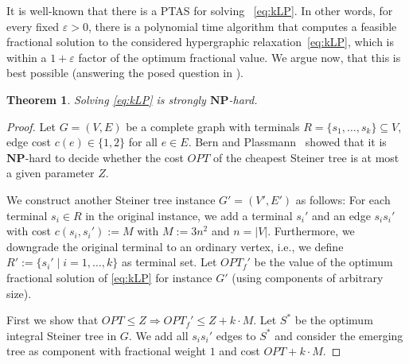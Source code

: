 \documentclass[11pt, letterpaper]{article}
\newtheorem{theorem}{Theorem}[section]
\theoremstyle{definition}
\newcommand{\neil}[1]{}
\newcommand{\neil}[1]{\emph{\color{darkgreen}{Neil: #1}}}
\begin{document}
It is well-known that there is a PTAS for solving ~\eqref{eq:kLP}. In other words, for every 
fixed $\varepsilon > 0$, there is a polynomial time algorithm that computes a feasible fractional solution 
to the considered hypergraphic relaxation~\eqref{eq:kLP}, which is within a $1+\varepsilon$ factor
of the optimum fractional value. 
We argue now, that this is best possible (answering the posed question in \cite{chakrabarty_2010_hypergraphic}).
\begin{theorem}
Solving \eqref{eq:kLP} is strongly $\mathbf{NP}$-hard. 
\end{theorem}
\begin{proof}
Let $G=(V,E)$ be a complete graph with terminals $R = \{ s_1,\ldots,s_k\}  \subseteq V$, edge cost 
$c(e) \in \{ 1,2\}$ for all $e \in E$. Bern and Plassmann~\cite{BP89} showed that  
it is $\mathbf{NP}$-hard to decide whether the cost $OPT$ of the 
cheapest Steiner tree is at most a given parameter $Z$. 

We construct another Steiner tree instance $G'=(V',E')$ as follows: 
For each terminal $s_i \in R$ in the original instance, we add 
a terminal $s_i'$ and an edge $s_is_i'$ with cost $c(s_i,s_i') := M$ with $M := 3n^2$ and $n= |V|$.
Furthermore, we downgrade the original terminal to
an ordinary vertex, i.e., we define $R' := \{ s_i' \mid i=1,\ldots,k\}$ as terminal set. Let $OPT_f'$ be the value of the optimum fractional solution
of \eqref{eq:kLP} for instance $G'$ (using components of arbitrary size). 
\begin{comment}
\begin{figure}[H]
\begin{center}
\subfigure[initial instance $G$]{ \texttt{[image: picture-sources-pics.pdf]}}
\hspace{1cm} \subfigure[constructed instance $G'$]{ \texttt{[image: picture-sources-pics.pdf]}}
\caption{Example for original Steiner tree instance $G$ depicted in $(a)$ and corresponding instance $G'$ is depicted in $(b)$.\label{fig:NPhardnessReduction}}
\end{center}
\end{figure}
\neil{I don't think we should have a picture for this. It's simple enough to understand from the text, and if a reviewer is skimming through the appendix, I'd rather focus their attention on other parts.}
\end{comment}

First we show that $OPT \leq Z \Rightarrow OPT_f' \leq Z + k\cdot M$. 
Let $S^*$ be the optimum integral Steiner tree in $G$. 
We add all $s_is_i'$ edges to $S^*$ and consider the emerging tree as 
component with fractional weight $1$ and cost $OPT + k\cdot M$.


\end{proof}
\end{document}

